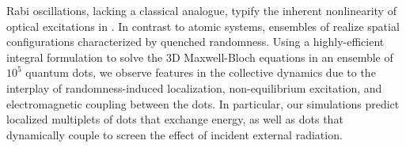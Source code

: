 Rabi oscillations, lacking a classical analogue, typify the inherent nonlinearity of optical excitations in \qds{}.
In contrast to atomic systems, ensembles of \qds{} realize spatial configurations characterized by quenched randomness.
Using a highly-efficient integral formulation to solve the 3D Maxwell-Bloch equations in an ensemble of $10^5$ quantum dots, we observe features in the collective dynamics due to the interplay of randomness-induced localization, non-equilibrium excitation, and electromagnetic coupling between the dots.
In particular, our simulations predict localized multiplets of dots that exchange energy, as well as dots that dynamically couple to screen the effect of incident external radiation.
